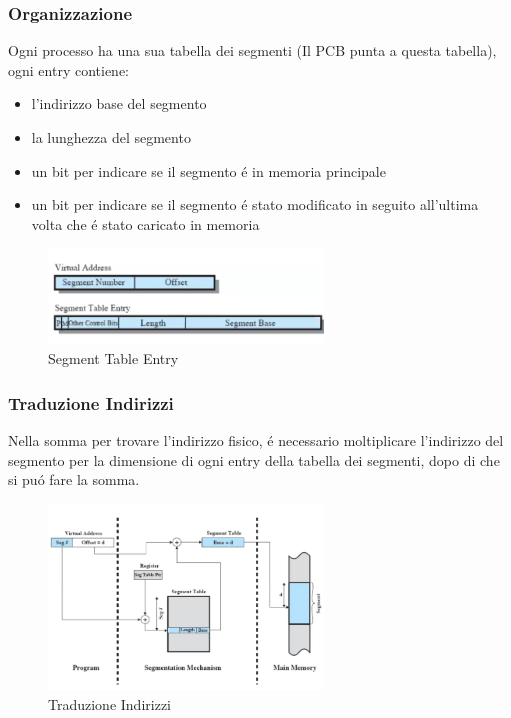     \subsubsection*{Organizzazione}
    Ogni processo ha una sua tabella dei segmenti (Il PCB punta a questa tabella), ogni entry contiene:
    \begin{itemize}
        \item l'indirizzo base del segmento
        \item la lunghezza del segmento
        \item un bit per indicare se il segmento é in memoria principale
        \item un bit per indicare se il segmento é stato modificato in seguito all'ultima volta che é stato caricato in memoria
    \end{itemize}
    \begin{figure}[H]
        \centering
        \includegraphics[width=0.65\textwidth]{immagini/OrganizzazioneSegmentazione}
        \caption{Segment Table Entry}
    \end{figure}
    \subsubsection*{Traduzione Indirizzi}
    Nella somma per trovare l'indirizzo fisico, é necessario moltiplicare l'indirizzo del segmento per la dimensione
    di ogni entry della tabella dei segmenti, dopo di che si puó fare la somma.
    \begin{figure}[H]
        \centering
        \includegraphics[width=0.65\textwidth]{immagini/Traduzione degli indirizzi Segmentazione}
        \caption{Traduzione Indirizzi}
    \end{figure}

